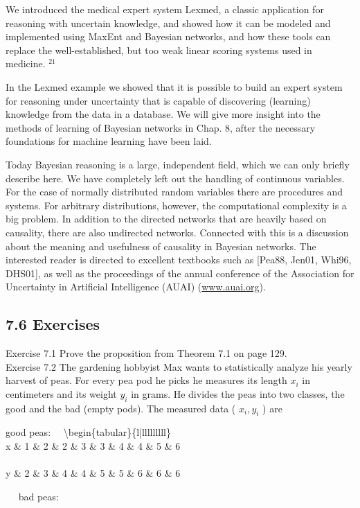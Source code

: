\documentclass[10pt]{book}
\begin{document}
\begin{center}
\begin{enumerate}
We introduced the medical expert system Lexmed, a classic application for reasoning with uncertain knowledge, and showed how it can be modeled and implemented using MaxEnt and Bayesian networks, and how these tools can replace the well-established, but too weak linear scoring systems used in medicine. ${ }^{21}$

In the Lexmed example we showed that it is possible to build an expert system for reasoning under uncertainty that is capable of discovering (learning) knowledge from the data in a database. We will give more insight into the methods of learning of Bayesian networks in Chap. 8, after the necessary foundations for machine learning have been laid.

Today Bayesian reasoning is a large, independent field, which we can only briefly describe here. We have completely left out the handling of continuous variables. For the case of normally distributed random variables there are procedures and systems. For arbitrary distributions, however, the computational complexity is a big problem. In addition to the directed networks that are heavily based on causality, there are also undirected networks. Connected with this is a discussion about the meaning and usefulness of causality in Bayesian networks. The interested reader is directed to excellent textbooks such as [Pea88, Jen01, Whi96, DHS01], as well as the proceedings of the annual conference of the Association for Uncertainty in Artificial Intelligence (AUAI) (\href{http://www.auai.org}{www.auai.org}).

\subsection*{7.6 Exercises}
Exercise 7.1 Prove the proposition from Theorem 7.1 on page 129.\\
Exercise 7.2 The gardening hobbyist Max wants to statistically analyze his yearly harvest of peas. For every pea pod he picks he measures its length $x_{i}$ in centimeters and its weight $y_{i}$ in grams. He divides the peas into two classes, the good and the bad (empty pods). The measured data ( $x_{i}, y_{i}$ ) are

good peas: $\quad$\textbackslash begin\{tabular\}\{l|lllllllll\}\\
x \& 1 \& 2 \& 2 \& 3 \& 3 \& 4 \& 4 \& 5 \& 6 \\
\\
y \& 2 \& 3 \& 4 \& 4 \& 5 \& 5 \& 6 \& 6 \& 6

$\quad$ bad peas: $\quad$\begin{tabular}{l|llll}
\end{tabular}


\end{enumerate}
\end{center}
\end{document}
